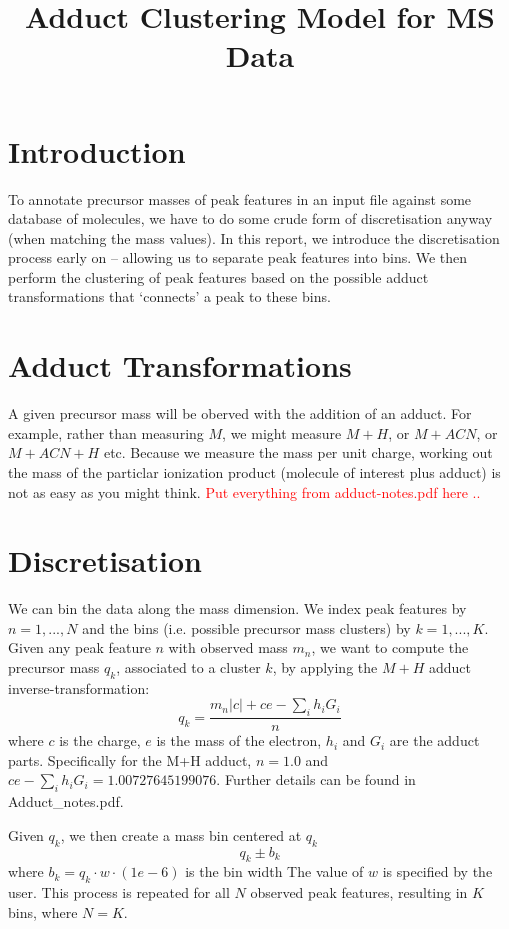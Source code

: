 \documentclass[12pt,a4paper]{article}
\title{Adduct Clustering Model for MS Data}
\newcommand\todo[1]{\textcolor{red}{#1}}
\begin{document}
\maketitle

\section{Introduction}

To annotate precursor masses of peak features in an input file against some database of molecules, we have to do some crude form of discretisation anyway (when matching the mass values). In this report, we introduce the discretisation process early on -- allowing us to separate peak features into bins. We then perform the clustering of peak features based on the possible adduct transformations that `connects' a peak to these bins.

\section{Adduct Transformations}

A given precursor mass will be oberved with the addition of an adduct. For example, rather than measuring $M$, we might measure $M+H$, or $M+ACN$, or $M+ACN+H$ etc. Because we measure the mass per unit charge, working out the mass of the particlar ionization product (molecule of interest plus adduct) is not as easy as you might think. \todo{Put everything from adduct-notes.pdf here ..}

\section{Discretisation}

We can bin the data along the mass dimension. We index peak features by $n=1,...,N$ and the bins (i.e. possible precursor mass clusters) by $k=1,...,K$. Given any peak feature $n$ with observed mass $m_{n}$, we want to compute the precursor mass $q_{k}$, associated to a cluster $k$, by applying the $M+H$ adduct inverse-transformation: 
\begin{equation}
q_{k}=\frac{m_{n}|c|+ce-\sum_{i}h_{i}G_{i}}{n}
\end{equation}
where $c$ is the charge, $e$ is the mass of the electron, $h_{i}$ and $G_{i}$ are the adduct parts. Specifically for the M+H adduct, $n=1.0$ and $ce-\sum_{i}h_{i}G_{i}=1.00727645199076$. Further details can be found in Adduct\_notes.pdf. 

Given $q_{k}$, we then create a mass bin centered at $q_{k}$ 
\begin{equation}
q_{k}\pm b_{k}
\end{equation}
where $b_{k}=q_{k}\cdot w\cdot(1e-6)$ is the bin width The value of $w$ is specified by the user. This process is repeated for all $N$ observed peak features, resulting in $K$ bins, where $N=K$. 
\end{document}

